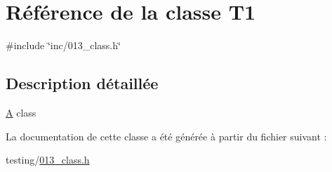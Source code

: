 \hypertarget{class_t1}{}\section{Référence de la classe T1}
\label{class_t1}


{\ttfamily \#include \char`\"{}inc/013\+\_\+class.\+h\char`\"{}}



\subsection{Description détaillée}
\hyperlink{class_a}{A} class 

La documentation de cette classe a été générée à partir du fichier suivant \+:\begin{DoxyCompactItemize}
\item 
testing/\hyperlink{013__class_8h}{013\+\_\+class.\+h}\end{DoxyCompactItemize}
